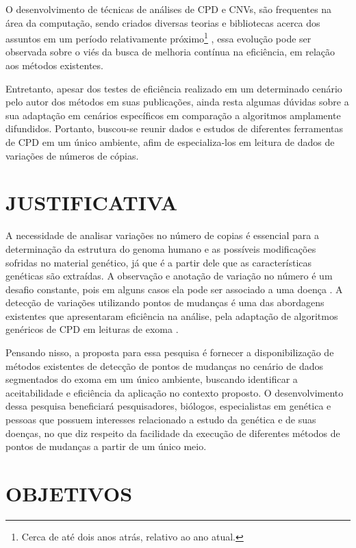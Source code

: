 O desenvolvimento de técnicas de análises de CPD e CNVs, são frequentes na área da computação, sendo criados diversas teorias e bibliotecas acerca dos assuntos em um período relativamente próximo\footnote{Cerca de até dois anos atrás, relativo ao ano atual.} \cite{Girimurugan2018,Uzai2019,Chu2019}, essa evolução pode ser observada sobre o viés da busca de melhoria contínua na eficiência, em relação aos métodos existentes.

Entretanto, apesar dos testes de eficiência realizado em um determinado cenário pelo autor dos métodos em suas publicações, ainda resta algumas dúvidas sobre a sua adaptação em cenários específicos em comparação a algoritmos amplamente difundidos. Portanto, buscou-se reunir dados e estudos de diferentes ferramentas de CPD em um único ambiente, afim de especializa-los em leitura de dados de variações de números de cópias.

\section{JUSTIFICATIVA}

A necessidade de analisar variações no número de copias é essencial para a determinação da estrutura do genoma humano e as possíveis modificações sofridas no material genético, já que é a partir dele que as características genéticas são extraídas. A observação e anotação de variação no número é um desafio constante, pois em alguns casos ela pode ser associado a uma doença \cite{McCarroll2007}. A detecção de variações utilizando pontos de mudanças é uma das abordagens existentes que apresentaram eficiência na análise, pela adaptação de algoritmos genéricos de CPD em leituras de exoma \cite{Olshen2004,Picard2011,Girimurugan2018}.

Pensando nisso, a proposta para essa pesquisa é fornecer a disponibilização de métodos existentes de detecção de pontos de mudanças no cenário de dados segmentados do exoma em um único ambiente, buscando identificar a aceitabilidade e eficiência da aplicação no contexto proposto. O desenvolvimento dessa pesquisa beneficiará pesquisadores, biólogos, especialistas em genética e pessoas que possuem interesses relacionado a estudo da genética e de suas doenças, no que diz respeito da facilidade da execução de diferentes métodos de pontos de mudanças a partir de um único meio.

\section{OBJETIVOS}

